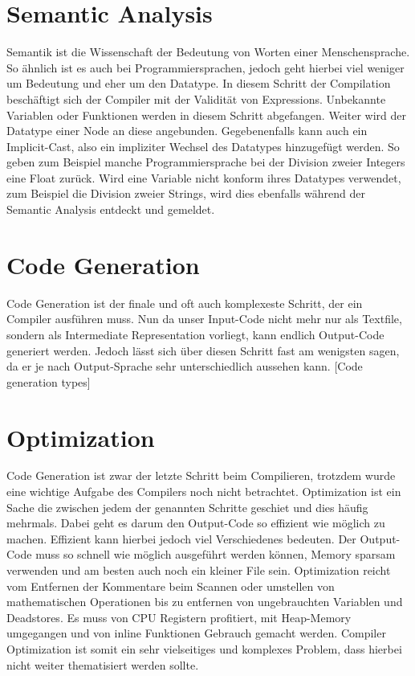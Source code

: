\section{Semantic Analysis}
Semantik ist die Wissenschaft der Bedeutung von Worten einer Menschensprache. So ähnlich ist es auch bei Programmiersprachen, jedoch geht hierbei viel weniger um Bedeutung und eher um den Datatype.
In diesem Schritt der Compilation beschäftigt sich der Compiler mit der Validität von Expressions. Unbekannte Variablen oder Funktionen werden in diesem Schritt abgefangen.
Weiter wird der Datatype einer Node an diese angebunden. Gegebenenfalls kann auch ein Implicit-Cast, also ein impliziter Wechsel des Datatypes hinzugefügt werden.
So geben zum Beispiel manche Programmiersprache bei der Division zweier Integers eine Float zurück. Wird eine Variable nicht konform ihres Datatypes verwendet, zum Beispiel die Division zweier Strings,
wird dies ebenfalls während der Semantic Analysis entdeckt und gemeldet.


\section{Code Generation}
Code Generation ist der finale und oft auch komplexeste Schritt, der ein Compiler ausführen muss. Nun da unser Input-Code nicht mehr nur als Textfile, sondern als Intermediate Representation vorliegt,
kann endlich Output-Code generiert werden. Jedoch lässt sich über diesen Schritt fast am wenigsten sagen, da er je nach Output-Sprache sehr unterschiedlich aussehen kann. 
[Code generation types]

\section{Optimization}
Code Generation ist zwar der letzte Schritt beim Compilieren, trotzdem wurde eine wichtige Aufgabe des Compilers noch nicht betrachtet. Optimization ist ein Sache die zwischen jedem der genannten Schritte geschiet
und dies häufig mehrmals. Dabei geht es darum den Output-Code so effizient wie möglich zu machen. Effizient kann hierbei jedoch viel Verschiedenes bedeuten. Der Output-Code muss so schnell wie möglich ausgeführt werden können,
Memory sparsam verwenden und am besten auch noch ein kleiner File sein. Optimization reicht vom Entfernen der Kommentare beim Scannen oder umstellen von mathematischen Operationen bis zu entfernen von ungebrauchten Variablen und Deadstores.
Es muss von CPU Registern profitiert, mit Heap-Memory umgegangen und von inline Funktionen Gebrauch gemacht werden. Compiler Optimization ist somit ein sehr vielseitiges und komplexes Problem,
dass hierbei nicht weiter thematisiert werden sollte.